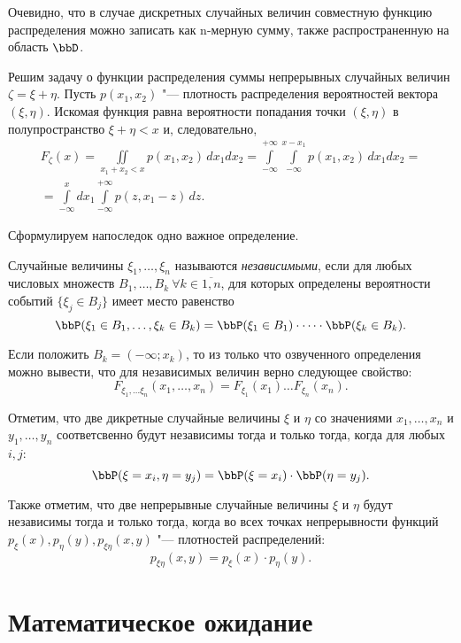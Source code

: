 Очевидно, что в случае дискретных случайных величин совместную функцию распределения можно записать как n-мерную сумму, также распространенную на область $\bbD$.


Решим задачу о функции распределения суммы непрерывных случайных величин $\zeta=\xi+\eta$. Пусть $p(x_1,x_2)$ "--- плотность распределения вероятностей вектора $(\xi,\eta)$. Искомая функция равна вероятности попадания точки $(\xi,\eta)$ в полупространство $\xi+\eta<x$ и, следовательно, 
\begin{multline}\label{ch31.1eq1}
F_{\zeta}(x)=\iint\limits_{x_1+x_2<x} p(x_1,x_2)\,dx_1 dx_2=\int\limits_{-\infty}^{+\infty}\int\limits_{-\infty}^{x-x_1}p(x_1,x_2)\,dx_1 dx_2=\\
=\int\limits_{-\infty}^{x}dx_1\int\limits_{-\infty}^{+\infty} p(z,x_1-z)\,dz.
\end{multline}

Сформулируем напоследок одно важное определение.
\begin{defn} Случайные величины $\xi_1,\dots,\xi_n$ называются \textit{независимыми}, если для любых числовых множеств $B_1,\dots, B_k\ \forall k\in\overline{1,n}$, для которых определены вероятности событий $\{\xi_j\in B_j\}$ имеет место равенство
$$
\bbP(\xi_1\in B_1,\dots, \xi_k \in B_k)=\bbP(\xi_1\in B_1)\cdot\dots\cdot \bbP(\xi_k \in B_k).
$$
\end{defn}

Если положить $B_k=(-\infty;x_k)$, то из только что озвученного определения можно вывести, что для независимых величин верно следующее свойство:
$$
F_{\xi_1,\dots\xi_n}(x_1,\dots,x_n)=F_{\xi_1}(x_1)\dots F_{\xi_n}(x_n).
$$

Отметим, что две дикретные случайные величины $\xi$ и $\eta$ со значениями $x_1,\dots,x_n$ и $y_1,\dots,y_n$ соответсвенно будут независимы тогда и только тогда, когда для любых $i,j$:
$$
\bbP(\xi = x_i, \eta = y_j) = \bbP (\xi = x_i)\cdot \bbP(\eta=y_j).
$$

Также отметим, что две непрерывные случайные величины $\xi$ и $\eta$ будут независимы тогда и только тогда, когда во всех точках непрерывности функций $p_\xi(x),p_\eta(y),p_{\xi\eta}(x,y)$ "--- плотностей распределений:
$$
p_{\xi\eta}(x,y)=p_\xi(x)\cdot p_\eta(y).
$$ 

\section{Математическое ожидание}

